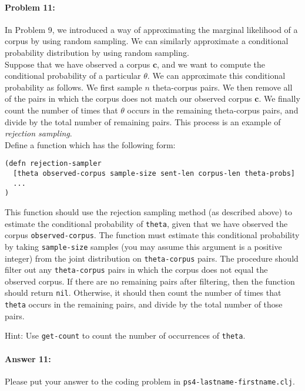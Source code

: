 \documentclass[10pt]{article}
\newcommand{\required}[1]{{\color{blue}{#1}}}
\newcommand{\PSnum}{4}
\begin{document}
\paragraph{Problem 11:}
 In Problem 9, we introduced a way of approximating the
marginal likelihood of a corpus by using random sampling. We can
similarly approximate a conditional probability distribution by using
random sampling.  \\

 Suppose that we have observed a corpus $\mathbf{c}$, and we
want to compute the conditional probability of a particular $\theta$.
We can approximate this conditional probability as follows. We first
sample $n$ theta-corpus pairs. We then remove all of the pairs in
which the corpus does not match our observed corpus $\mathbf{c}$. We
finally count the number of times that $\theta$ occurs in the
remaining theta-corpus pairs, and divide by the total number of
remaining pairs. This process is an example of \textit{rejection sampling}.
\\

 Define a function \required{\texttt{rejection-sampler}}
which has the following form:
 
\begin{lstlisting}
(defn rejection-sampler
  [theta observed-corpus sample-size sent-len corpus-len theta-probs]
  ...
)
\end{lstlisting}

 This function should use the rejection sampling method (as
described above) to estimate the conditional probability of
\texttt{theta}, given that we have observed the corpus
\texttt{observed-corpus}. The function must estimate this conditional
probability by taking \texttt{sample-size} samples (you may assume
this argument is a positive integer) from the joint distribution on
\texttt{theta-corpus} pairs. The procedure should filter out any
\texttt{theta-corpus} pairs in which the corpus does not equal the
observed corpus. If there are no remaining pairs after filtering, then 
the function should return \texttt{nil}. Otherwise,
it should then count the number of times that \texttt{theta} occurs in the remaining pairs,
and divide by the total number of those pairs.

Hint: Use \texttt{get-count} to count the number of occurrences
of \texttt{theta}.

\paragraph{Answer 11:} Please put your answer to the coding problem in
\texttt{ps\PSnum-lastname-firstname.clj}.
\end{document}
